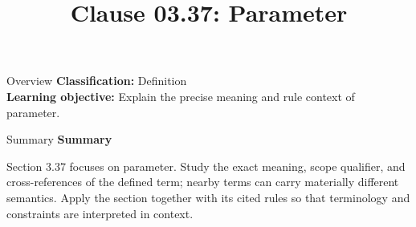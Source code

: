 \documentclass[10pt,letterpaper]{article}
\title{Clause 03.37: Parameter}
\author{}
\date{}
\begin{document}
\maketitle
\begin{CornellOverviewBox}{Overview}
\textbf{Classification:} Definition\\[2pt]
\textbf{Learning objective:} Explain the precise meaning and rule context of parameter.
\end{CornellOverviewBox}\begin{CornellSummaryBox}{Summary}
{\sffamily\bfseries\color{Accent} Summary}\par\vspace{3pt}Section 3.37 focuses on parameter. Study the exact meaning, scope qualifier, and cross-references of the defined term; nearby terms can carry materially different semantics. Apply the section together with its cited rules so that terminology and constraints are interpreted in context.
\end{CornellSummaryBox}
\end{document}
